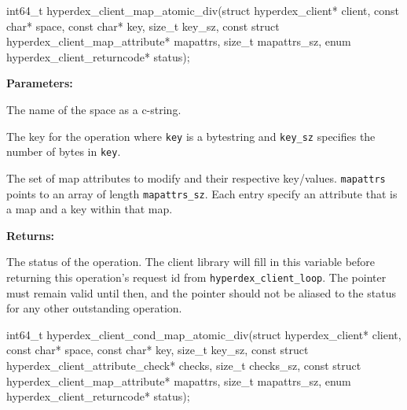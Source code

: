 \funcsep
\begin{ccode}
int64_t hyperdex_client_map_atomic_div(struct hyperdex_client* client,
                const char* space,
                const char* key, size_t key_sz,
                const struct hyperdex_client_map_attribute* mapattrs, size_t mapattrs_sz,
                enum hyperdex_client_returncode* status);
\end{ccode}
\funcdesc 

\noindent\textbf{Parameters:}
\begin{description}[labelindent=\widthof{{\texttt{mapattrs}, \texttt{mapattrs\_sz}}},leftmargin=*,noitemsep,nolistsep,align=right]
\item[\texttt{space}] The name of the space as a c-string.
\item[\texttt{key}, \texttt{key\_sz}] The key for the operation where \texttt{key} is a bytestring and \texttt{key\_sz} specifies the number of bytes in \texttt{key}.
\item[\texttt{mapattrs}, \texttt{mapattrs\_sz}] The set of map attributes to modify and their respective key/values.  \texttt{mapattrs} points to an array of length \texttt{mapattrs\_sz}.  Each entry specify an attribute that is a map and a key within that map.
\end{description}

\noindent\textbf{Returns:}
\begin{description}[labelindent=\widthof{{\texttt{status}}},leftmargin=*,noitemsep,nolistsep,align=right]
\item[\texttt{status}] The status of the operation.  The client library will fill in this variable before returning this operation's request id from \texttt{hyperdex\_client\_loop}.  The pointer must remain valid until then, and the pointer should not be aliased to the status for any other outstanding operation.
\end{description}

\funcsep
\begin{ccode}
int64_t hyperdex_client_cond_map_atomic_div(struct hyperdex_client* client,
                const char* space,
                const char* key, size_t key_sz,
                const struct hyperdex_client_attribute_check* checks, size_t checks_sz,
                const struct hyperdex_client_map_attribute* mapattrs, size_t mapattrs_sz,
                enum hyperdex_client_returncode* status);
\end{ccode}
\funcdesc 

